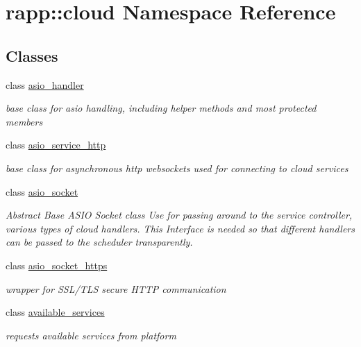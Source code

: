 \hypertarget{namespacerapp_1_1cloud}{\section{rapp\-:\-:cloud Namespace Reference}
\label{namespacerapp_1_1cloud}
}
\subsection*{Classes}
\begin{DoxyCompactItemize}
\item 
class \hyperlink{classrapp_1_1cloud_1_1asio__handler}{asio\-\_\-handler}
\begin{DoxyCompactList}\small\item\em base class for asio handling, including helper methods and most protected members \end{DoxyCompactList}\item 
class \hyperlink{classrapp_1_1cloud_1_1asio__service__http}{asio\-\_\-service\-\_\-http}
\begin{DoxyCompactList}\small\item\em base class for asynchronous http websockets used for connecting to cloud services \end{DoxyCompactList}\item 
class \hyperlink{classrapp_1_1cloud_1_1asio__socket}{asio\-\_\-socket}
\begin{DoxyCompactList}\small\item\em Abstract Base A\-S\-I\-O Socket class Use for passing around to the service controller, various types of cloud handlers. This Interface is needed so that different handlers can be passed to the scheduler transparently. \end{DoxyCompactList}\item 
class \hyperlink{classrapp_1_1cloud_1_1asio__socket__https}{asio\-\_\-socket\-\_\-https}
\begin{DoxyCompactList}\small\item\em wrapper for S\-S\-L/\-T\-L\-S secure H\-T\-T\-P communication \end{DoxyCompactList}\item 
class \hyperlink{classrapp_1_1cloud_1_1available__services}{available\-\_\-services}
\begin{DoxyCompactList}\small\item\em requests available services from platform \end{DoxyCompactList}\item 

\end{DoxyCompactItemize}
